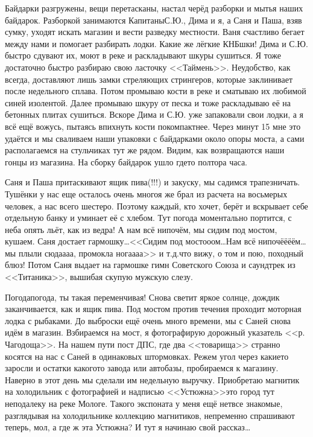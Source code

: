 Байдарки разгружены, вещи перетасканы, настал черёд разборки и мытья наших байдарок. Разборкой занимаются Капитаны\mdash С.Ю., Дима и я, а Саня и Паша, взяв сумку, уходят искать магазин и вести разведку местности. Ваня счастливо бегает между нами и помогает разбирать лодки. Какие же лёгкие КНБ\sdash шки! Дима и С.Ю. быстро сдувают их, моют в реке и раскладывают шкуры сушиться. Я тоже достаточно быстро разбираю свою ласточку <<Таймень>>. Неудобство, как всегда, доставляют лишь замки стреляющих стрингеров, которые заклинивает после недельного сплава. Потом промываю кости в реке и сматываю их любимой синей изолентой. Далее промываю шкуру от песка и тоже раскладываю её на бетонных плитах сушиться. Вскоре Дима и С.Ю. уже запаковали свои лодки, а я всё ещё вожусь, пытаясь впихнуть кости покомпактнее. Через минут 15 мне это удаётся и мы сваливаем наши упаковки с байдарками около опоры моста, а сами располагаемся на стульчиках тут же рядом. Видим, как возвращаются наши гонцы из магазина. На сборку байдарок ушло где\sdash то полтора часа.

Саня и Паша притаскивают ящик пива(!!!) и закуску, мы садимся трапезничать. Тушёнки у нас еще осталось очень много\mdash я же брал из расчета на восьмерых человек, а нас всего шестеро. Поэтому каждый, кто хочет, берёт и вскрывает себе отдельную банку и уминает её с хлебом. Тут погода моментально портится, с неба опять льёт, как из ведра! А нам всё нипочём, мы сидим под мостом, кушаем. Саня достает гармошку\ldots <<Сидим под мосто\sdash о\sdash ом\ldots Нам всё нипочё\sdash ё\sdash ё\sdash ём\ldots мы плыли сюда\sdash а\sdash а\sdash а, промокла нога\sdash а\sdash а\sdash а>> и т.д.\mdash что вижу, о том и пою, походный блюз! Потом Саня выдает на гармошке гимн Советского Союза и саундтрек из <<Титаника>>, вышибая скупую мужскую слезу. 

Погода\sdash погода, ты такая переменчивая! Снова светит яркое солнце, дождик заканчивается, как и ящик пива. Под мостом против течения проходит моторная лодка с рыбаками. До выброски ещё очень много времени, мы с Саней снова идём в магазин.  Взбираемся на мост, я фотографирую дорожный указатель <<р. Чагодоща>>. На нашем пути пост ДПС, где два <<товарища>> странно косятся на нас с Саней в одинаковых штормовках. Режем угол через какие\sdash то заросли и остатки какого\sdash то завода или автобазы, пробираемся к магазину. Наверно в этот день мы сделали им недельную выручку. Приобретаю магнитик на холодильник с фотографией и надписью <<Устюжна>>\mdash это город тут неподалеку на реке Мологе. Такого экспоната у меня ещё нет\mdash все знакомые, разглядывая на холодильнике коллекцию магнитиков, непременно спрашивают теперь, мол, а где ж эта Устюжна? И тут я начинаю свой рассказ\ldots


